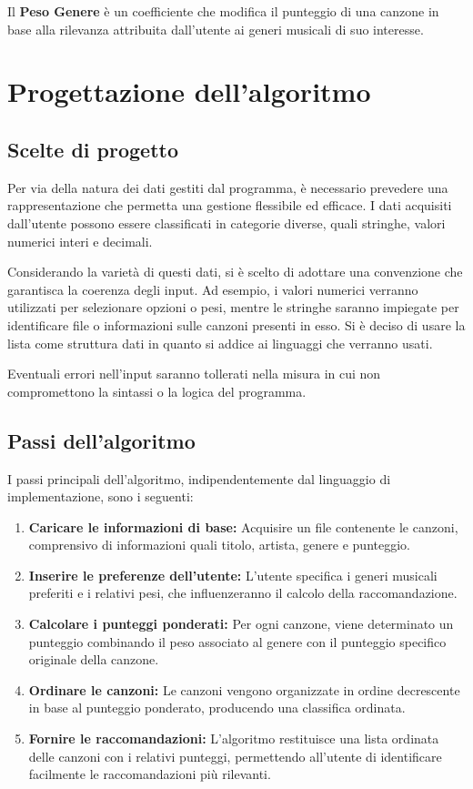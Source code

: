 \documentclass[a4paper,11pt]{article}
\begin{document}
\noindent
Il \textbf{Peso Genere} è un coefficiente che modifica il punteggio di una canzone in base alla rilevanza attribuita dall'utente ai generi musicali di suo interesse.

\newpage
\section{Progettazione dell'algoritmo}
\subsection{Scelte di progetto}
Per via della natura dei dati gestiti dal programma, è necessario prevedere una rappresentazione che permetta una gestione flessibile ed efficace. I dati acquisiti dall'utente possono essere classificati in categorie diverse, quali stringhe, valori numerici interi e decimali. 

Considerando la varietà di questi dati, si è scelto di adottare una convenzione che garantisca la coerenza degli input. Ad esempio, i valori numerici verranno utilizzati per selezionare opzioni o pesi, mentre le stringhe saranno impiegate per identificare file o informazioni sulle canzoni presenti in esso. Si è deciso di usare la lista come struttura dati in quanto si addice ai linguaggi che verranno usati. 

 Eventuali errori nell'input saranno tollerati nella misura in cui non compromettono la sintassi o la logica del programma. 

\subsection{Passi dell'algoritmo}
I passi principali dell'algoritmo, indipendentemente dal linguaggio di implementazione, sono i seguenti:

\begin{enumerate}
    \item \textbf{Caricare le informazioni di base:} 
    Acquisire un file contenente le canzoni, comprensivo di informazioni quali titolo, artista, genere e punteggio.
    \item \textbf{Inserire le preferenze dell'utente:} 
    L’utente specifica i generi musicali preferiti e i relativi pesi, che influenzeranno il calcolo della raccomandazione.
    \item \textbf{Calcolare i punteggi ponderati:} 
    Per ogni canzone, viene determinato un punteggio combinando il peso associato al genere con il punteggio specifico originale della canzone.
    \item \textbf{Ordinare le canzoni:} 
    Le canzoni vengono organizzate in ordine decrescente in base al punteggio ponderato, producendo una classifica ordinata.
    \item \textbf{Fornire le raccomandazioni:} 
    L'algoritmo restituisce una lista ordinata delle canzoni con i relativi punteggi, permettendo all'utente di identificare facilmente le raccomandazioni più rilevanti.
\end{enumerate}
\newpage
\end{document}
